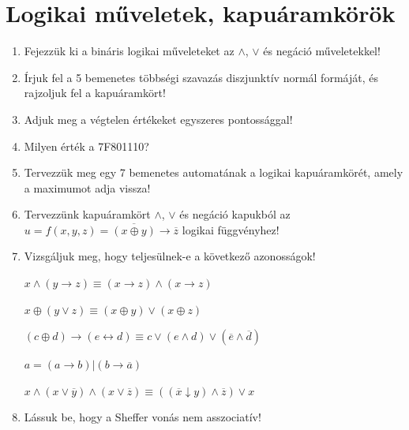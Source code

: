 \documentclass[a4paper]{article}
\begin{document}
\section*{Logikai műveletek, kapuáramkörök}

\begin{enumerate}

\item

Fejezzük ki a bináris logikai műveleteket az $\wedge$, $\vee$ és negáció műveletekkel!

\item

Írjuk fel a 5 bemenetes többségi szavazás diszjunktív normál formáját, és rajzoljuk fel a kapuáramkört!

\item

Adjuk meg a végtelen értékeket egyszeres pontossággal!

\item

Milyen érték a 7F801110?

\item

Tervezzük meg egy 7 bemenetes automatának a logikai kapuáramkörét, amely a maximumot adja vissza!

\item

Tervezzünk kapuáramkört $\wedge$, $\vee$ és negáció kapukból az $u = f(x, y, z) = \overline{(x \oplus y)} \rightarrow \overline{z}$ logikai függvényhez!

\item

Vizsgáljuk meg, hogy teljesülnek-e a következő azonosságok!

$x \wedge (y \rightarrow z) \equiv (x \rightarrow z) \wedge (x \rightarrow z)$

$x \oplus (y \vee z) \equiv (x \oplus y) \vee (x \oplus z)$

$(c \oplus d) \rightarrow (e \leftrightarrow d) \equiv c \vee (e \wedge d) \vee (\overline{e} \wedge \overline{d})$

$a = (a \rightarrow b)|(b \rightarrow \overline{a})$

$x \wedge (x \vee \overline{y}) \wedge (x \vee \overline{z}) \equiv ((\overline{x} 
\downarrow y) \wedge \overline{z}) \vee x$

\item

Lássuk be, hogy a Sheffer vonás nem asszociatív!


\end{enumerate}
\end{document}

